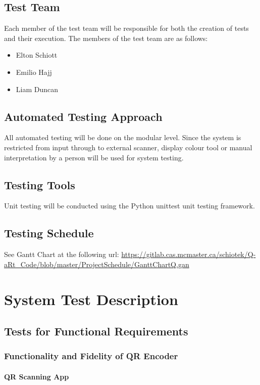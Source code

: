 \documentclass[12pt, titlepage]{article}
\begin{document}
\subsection{Test Team}
	Each member of the test team will be responsible for both the creation of 
	tests and their execution. The members of the test team are as follows:
	\begin{itemize}
		\item Elton Schiott
		\item Emilio Hajj
		\item Liam Duncan
	\end{itemize}
\subsection{Automated Testing Approach}
	All automated testing will be done on the modular level. 
    Since the system is restricted from input through to external scanner, display colour tool or manual interpretation by a person will be used for system testing.

\subsection{Testing Tools}
	Unit testing will be conducted using the Python unittest unit testing framework.
\subsection{Testing Schedule}
		
See Gantt Chart at the following url:
\url{https://gitlab.cas.mcmaster.ca/schiotek/Q-aRt_Code/blob/master/ProjectSchedule/GanttChartQ.gan}

\section{System Test Description}
	
\subsection{Tests for Functional Requirements}

\subsubsection{Functionality and Fidelity of QR Encoder}
		
\paragraph{QR Scanning App}
\end{document}
